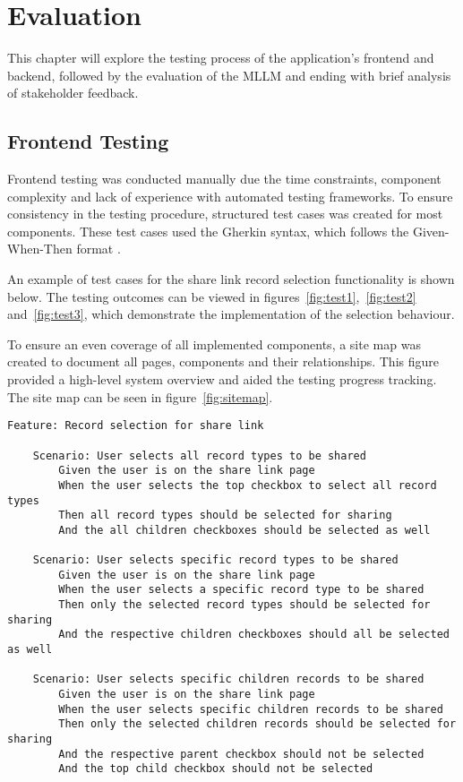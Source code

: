 \chapter{Evaluation}

This chapter will explore the testing process of the application's frontend and backend, followed by the evaluation of the MLLM and ending with brief analysis of stakeholder feedback.

\section{Frontend Testing}

Frontend testing was conducted manually due the time constraints, component complexity and lack of experience with automated testing frameworks. To ensure consistency in the testing procedure, structured test cases was created for most components. These test cases used the Gherkin syntax, which follows the Given-When-Then format \parencite{gherkin}. 

An example of test cases for the share link record selection functionality is shown below. The testing outcomes can be viewed in figures~\ref{fig:test1},~\ref{fig:test2} and~\ref{fig:test3}, which demonstrate the implementation of the selection behaviour.

To ensure an even coverage of all implemented components, a site map was created to document all pages, components and their relationships. This figure provided a high-level system overview and aided the testing progress tracking. The site map can be seen in figure~\ref{fig:sitemap}.

\clearpage

\begin{lstlisting}[language=Gherkin, caption=Test cases for selecting records to be shared in a share link]
    Feature: Record selection for share link

    Scenario: User selects all record types to be shared
        Given the user is on the share link page
        When the user selects the top checkbox to select all record types
        Then all record types should be selected for sharing
        And the all children checkboxes should be selected as well 
    
    Scenario: User selects specific record types to be shared
        Given the user is on the share link page
        When the user selects a specific record type to be shared
        Then only the selected record types should be selected for sharing
        And the respective children checkboxes should all be selected as well

    Scenario: User selects specific children records to be shared
        Given the user is on the share link page
        When the user selects specific children records to be shared
        Then only the selected children records should be selected for sharing
        And the respective parent checkbox should not be selected
        And the top child checkbox should not be selected
\end{lstlisting}

